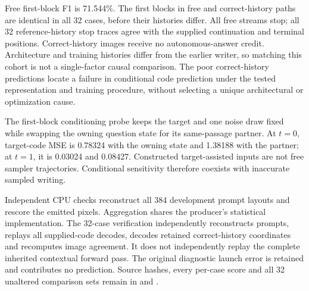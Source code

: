 \documentclass[10pt,a4paper]{article}
\begin{document}
Free first-block F1 is 71.544\%. The first blocks in free and correct-history
paths are identical in all 32 cases, before their histories differ. All free
streams stop; all 32 reference-history stop traces agree with the supplied
continuation and terminal positions. Correct-history images receive no
autonomous-answer credit. Architecture and training histories differ from
the earlier writer, so matching this cohort is not a single-factor causal
comparison. The poor correct-history predictions locate a failure in
conditional code prediction under the tested representation and training
procedure, without selecting a unique architectural or optimization cause.

The first-block conditioning probe keeps the target and one noise draw fixed
while swapping the owning question state for its same-passage partner. At
$t=0$, target-code MSE is 0.78324 with the owning state and 1.38188 with the
partner; at $t=1$, it is 0.03024 and 0.08427. Constructed target-assisted inputs
are not free sampler trajectories. Conditional sensitivity therefore coexists
with inaccurate sampled writing.

Independent CPU checks reconstruct all 384 development prompt layouts and
rescore the emitted pixels. Aggregation shares the producer's statistical
implementation. The 32-case verification independently reconstructs prompts,
replays all supplied-code decodes, decodes retained correct-history coordinates
and recomputes image agreement. It does not independently replay the complete
inherited contextual forward pass. The original diagnostic launch error is
retained and contributes no prediction. Source hashes, every per-case score
and all 32 unaltered comparison sets remain in
 and
.

\end{document}
